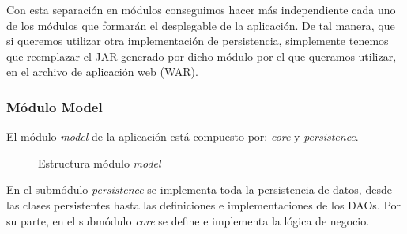 Con esta separación en módulos conseguimos hacer más independiente cada uno de los módulos que formarán el desplegable de la aplicación. De tal manera, que si queremos utilizar otra implementación de persistencia, simplemente tenemos que reemplazar el JAR generado por dicho módulo por el que queramos utilizar, en el archivo de aplicación web (WAR).

\subsubsection*{Módulo Model}
El módulo \textit{model} de la aplicación está compuesto por: \textit{core} y \textit{persistence}.

\begin{figure}[H]
\centering
{}
\caption{Estructura módulo \textit{model}}
\end{figure}

En el submódulo \textit{persistence} se implementa toda la persistencia de datos, desde las clases persistentes hasta las definiciones e implementaciones de los DAOs. Por su parte, en el submódulo \textit{core} se define e implementa la lógica de negocio.

